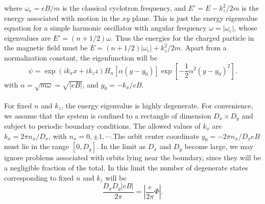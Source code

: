 where $\omega_{\mathrm{c}} = {eB}/{m}$ is the classical cyclotron frequency, and $E'=E - {k_z^2}/{2m}$ is the energy associated with motion in the $xy$ plane. 
This is just the energy eigenvalue equation for a simple harmonic oscillator with angular frequency $\omega = |\omega_{\mathrm{c}}|$, whose eigenvalues are $E' = (n+1/2)\omega$. Thus the energies for the charged particle in the magnetic field must be $E = (n+1/2)|\omega_{\mathrm{c}}|+{k_z^2}/{2m}$. 
Apart from a normalization constant, the eigenfunction will be
\[\psi = \exp(ik_xx+ik_zz) H_n[\alpha(y-y_0)]\exp[-\frac{1}{2}\alpha^2 (y-y_0)^2].\]
with $\alpha = \sqrt{m\omega} = \sqrt{|eB|}$, and $y_0 = - {k_x}/{eB}$.
\\ \\
For fixed $n$ and $k_z$, the energy eigenvalue is highly degenerate. For convenience, we assume that the system is confined to a rectangle of dimension $D_x\times D_y$ and subject to periodic boundary conditions. The allowed
values of $k_x$ are $k_x = {2\pi n_x}/{D_x}$, with $n_x = 0,\pm1,\cdots$.The orbit center coordinate $y_0 = -{2\pi n_x}/{D_xeB}$ must lie in the range $[0,D_y]$. 
In the limit as $D_x$ and $D_y$ become large, we may ignore problems associated with orbits lying near the boundary, since they will be a negligible fraction of the total. In this limit the number of degenerate states corresponding to fixed $n$ and $k_z$ will be
\[\frac{D_xD_y |eB|}{2\pi} = \left| \frac{e}{2\pi} \Phi \right|.\]

